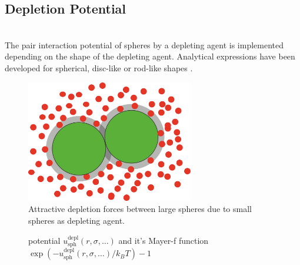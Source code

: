 \newpage
\subsection{Depletion Potential}
~\\

The pair interaction potential of spheres by a depleting agent is implemented depending on the shape of the depleting agent. Analytical expressions have been developed for
spherical, disc-like or rod-like shapes \cite{Oversteegen2004,Lekkerkerker2011}.

\begin{figure}[htb]
\includegraphics[width=0.65\textwidth]{../images/OZsolver/potentials/DepletionSketchSphSph.png}  \caption{Attractive depletion forces between large spheres due to small spheres as depleting agent.}
\end{figure}

\begin{figure}[htb]
\centering
  \quad
  \caption{potential $u^\text{depl}_\text{sph}(r,\sigma,\ldots)$ and it's Mayer-f function $\exp(-u^\text{depl}_\text{sph}(r,\sigma,\ldots)/k_BT)-1$}
\end{figure}

